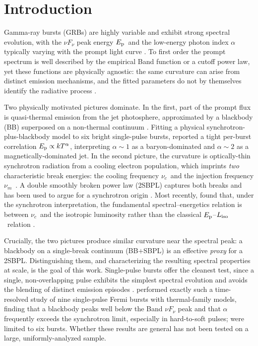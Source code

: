 \documentclass[twocolumn]{aastex631}
\newcommand{\nuc}{\ensuremath{\nu_c}}
\newcommand{\num}{\ensuremath{\nu_m}}
\newcommand{\Ep}{\ensuremath{E_{\rm p}}}
\newcommand{\kT}{\ensuremath{kT}}
\newcommand{\Liso}{\ensuremath{L_{\rm iso}}}
\begin{document}
\section{Introduction} \label{sec:intro}
Gamma-ray bursts (GRBs) are highly variable and exhibit strong spectral
evolution, with the $\nu F_\nu$ peak energy \Ep\ and the low-energy photon index
$\alpha$ typically varying with the prompt light curve
\citep[e.g.,][]{Norris1996,Kaneko2006,Lu2012,Yu2016}. To first order the prompt
spectrum is well described by the empirical Band function \citep{Band1993} or a
cutoff power law, yet these functions are physically agnostic: the same curvature
can arise from distinct emission mechanisms, and the fitted parameters do not by
themselves identify the radiative process \citep[e.g.,][]{KumarZhang2015}.

Two physically motivated pictures dominate. In the first, part of the prompt flux
is quasi-thermal emission from the jet photosphere, approximated by a blackbody
(BB) superposed on a non-thermal continuum
\citep[e.g.,][]{MeszarosRees2000,Ryde2004,Peer2007,Guiriec2010,Guiriec2011}.
Fitting a physical synchrotron-plus-blackbody model to six bright single-pulse
bursts, \citet{Burgess2014a} reported a tight per-burst correlation
$\Ep\propto\kT^{\alpha}$, interpreting $\alpha\!\sim\!1$ as a baryon-dominated
and $\alpha\!\sim\!2$ as a magnetically-dominated jet. In the second picture, the
curvature is optically-thin synchrotron radiation from a cooling electron
population, which imprints \emph{two} characteristic break energies: the cooling
frequency \nuc\ and the injection frequency \num\ \citep{Sari1998}. A double
smoothly broken power law (2SBPL) captures both breaks and has been used to argue
for a synchrotron origin
\citep[e.g.,][]{Oganesyan2017,Oganesyan2018,Ravasio2018,Ravasio2019}. Most
recently, \citet{Mei2025} found that, under the synchrotron interpretation, the
fundamental spectral--energetics relation is between \nuc\ and the isotropic
luminosity rather than the classical $\Ep$--\Liso\ relation
\citep[the Yonetoku relation;][]{Yonetoku2004}.

Crucially, the two pictures produce similar curvature near the spectral peak: a
blackbody on a single-break continuum (BB$+$SBPL) is an effective \emph{proxy}
for a 2SBPL. Distinguishing them, and characterizing the resulting spectral
properties at scale, is the goal of this work. Single-pulse bursts offer the
cleanest test, since a single, non-overlapping pulse exhibits the simplest
spectral evolution and avoids the blending of distinct emission episodes
\citep[e.g.,][]{RydePeer2009,Basak2014,Burgess2014b,Busby2024}.
\citet{Basak2014} performed exactly such a time-resolved study of nine
single-pulse Fermi bursts with thermal-family models, finding that a blackbody
peaks well below the Band $\nu F_\nu$ peak and that $\alpha$ frequently exceeds
the synchrotron limit, especially in hard-to-soft pulses; \citet{Burgess2014a}
were limited to six bursts. Whether these results are general has not been tested
on a large, uniformly-analyzed sample.
\end{document}
